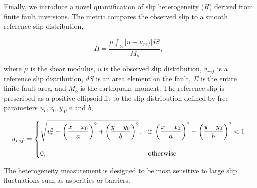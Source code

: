 \documentclass[draft, jgrga]{agujournal2018}
\begin{document}
Finally, we introduce a novel quantification of slip heterogeneity ($H$) derived from finite fault inversions. The metric compares the observed slip to a smooth reference slip distribution,
%
\begin{linenomath*}
\begin{equation}
    H = \dfrac{\mu \int_\Sigma |u-u_{ref}| dS}{M_o},
\end{equation}
\end{linenomath*}
%
where $\mu$ is the shear modulus, $u$ is the observed slip distribution, $u_{ref}$ is a reference slip distribution, $dS$ is an area element on the fault, $\Sigma$ is the entire finite fault area, and $M_o$ is the earthquake moment. The reference slip is prescribed as a positive ellipsoid fit to the slip distribution defined by free parameters $u_{c}, x_0, y_0, a$ and $b$,
%
\begin{linenomath*}
\begin{equation}\label{eq:heterogeneity}
u_{ref}=\left\{
\begin{array}{@{}ll@{}}
     \sqrt{u_{c}^2 - \left(\dfrac{x-x_0}{a}\right)^2 +  \left(\dfrac{y-y_0}{b}\right)^2}, & \text{if}\ \left(\dfrac{x-x_0}{a}\right)^2 +  \left(\dfrac{y-y_0}{b}\right)^2 < 1 \\
     \\
    0, & \text{otherwise}
    \end{array}\right.
\end{equation}
\end{linenomath*}
%
The heterogeneity measurement is designed to be most sensitive to large slip fluctuations such as asperities or barriers.
\end{document}
